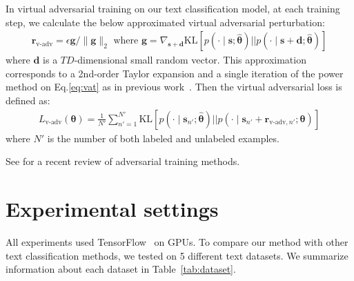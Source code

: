 \documentclass{article}
\newcommand{\vg}{{\bm{g}}}
\newcommand{\vs}{\bm{s}}
\newcommand{\vr}{\bm{r}}
\newcommand{\vd}{\bm{d}}
\newcommand{\vtheta}{\bm{\theta}}
\begin{document}
In virtual adversarial training on our text classification model, at each training step,
we calculate the below approximated virtual adversarial perturbation: 
\begin{align}
	\vr_{\mathrm{v\text{-}adv}} = \epsilon {\vg} / {\| \vg \|_2 } \text{ where } \vg = \nabla_{\vs+\vd} {\mathrm{KL}}\left[p(\cdot \mid \vs; \hat{\vtheta})|| p(\cdot \mid \vs+\vd; \hat{\vtheta})\right] \label{eq:vat_ptb}
\end{align}
where $\vd$ is a $TD$-dimensional small random vector. 
This approximation corresponds to a 2nd-order Taylor expansion
and a single iteration of the power method on Eq.\eqref{eq:vat} as in previous
work~\cite[]{miyato2015distributional}. 
Then the virtual adversarial loss is defined as:
\begin{align}
	L_{\mathrm{v\text{-}adv}}(\vtheta) = \frac{1}{N'} \sum_{n'=1}^{N'} {\mathrm{KL}}\left[p(\cdot \mid \vs_{n'}; \hat{\vtheta})|| p(\cdot \mid
	\vs_{n'}+\vr_{{\mathrm{v\text{-}adv}},n'}; \vtheta)\right]
	\label{eq:vadv_loss} 
\end{align}
where $N'$ is the number of both labeled and unlabeled examples.



See \citet{wardefarley2016} for a recent review of adversarial training methods.

\section{\label{sec:exp_set}Experimental settings}
All experiments used TensorFlow~\cite[]{abadi2016tensorflow} on GPUs.
To compare our method with other text classification methods, we tested on 5 
different text datasets. We summarize information about each dataset in Table~\ref{tab:dataset}.
\end{document}
